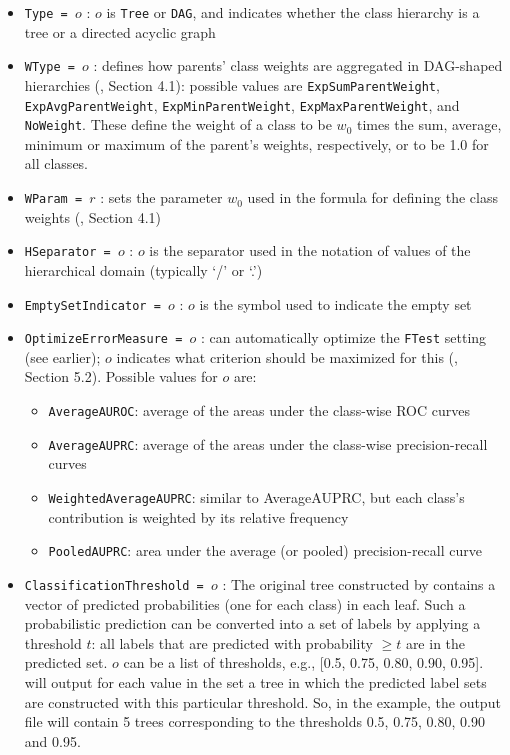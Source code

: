 \begin{itemize}
	\item {\tt Type = $o$} : $o$ is {\tt Tree} or {\tt DAG}, and indicates whether the class hierarchy is a tree or a directed acyclic graph \cite{Vens08:jrnl}
	\item {\tt WType = $o$} : defines how parents' class weights are aggregated in DAG-shaped hierarchies (\cite{Vens08:jrnl}, Section 4.1): possible values are {\tt ExpSumParentWeight}, {\tt ExpAvgParentWeight}, {\tt ExpMinParentWeight}, {\tt ExpMaxParentWeight}, and {\tt NoWeight}.  These define the weight of a class to be $w_0$ times the sum, average, minimum or maximum of the parent's weights, respectively, or to be 1.0 for all classes. 
	\item {\tt WParam = $r$} : sets the parameter $w_0$ used in the formula for defining the class weights (\cite{Vens08:jrnl}, Section 4.1)
	\item {\tt HSeparator = $o$} : $o$ is the separator used in the notation of values of the hierarchical domain (typically `/' or `.') 
	\item {\tt EmptySetIndicator = $o$} : $o$ is the symbol used to indicate the empty set
	\item {\tt OptimizeErrorMeasure = $o$} : \clus{} can automatically optimize the {\tt FTest} setting (see earlier); $o$ indicates what criterion should be maximized for this (\cite{Vens08:jrnl}, Section 5.2).  Possible values for $o$ are:
	\begin{itemize}
		\item {\tt AverageAUROC}: average of the areas under the class-wise ROC curves
		\item {\tt AverageAUPRC}: average of the areas under the class-wise precision-recall curves
		\item {\tt WeightedAverageAUPRC}: similar to AverageAUPRC, but each class's contribution is weighted by its relative frequency
		\item {\tt PooledAUPRC}: area under the average (or pooled) precision-recall curve
	\end{itemize}
	\item {\tt ClassificationThreshold = $o$} : The original tree constructed by \clus{} contains a vector of predicted probabilities (one for each class) in each leaf. Such a probabilistic prediction can be converted into a set of labels by applying a threshold $t$: all labels that are predicted with probability $\geq t$ are in the predicted set.  $o$ can be a list of thresholds, e.g., [0.5, 0.75, 0.80, 0.90, 0.95]. \clus{} will output for each value in the set a tree in which the predicted label sets are constructed with this particular threshold. So, in the example, the output file will contain 5 trees corresponding to the thresholds 0.5, 0.75, 0.80, 0.90 and 0.95.
	

\end{itemize}
